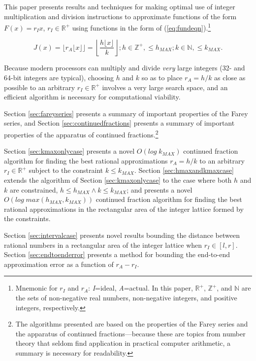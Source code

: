 \documentclass{esub2acm}
\newcommand{\realsetnonneg}{{\mathbb{R}^+}}
\newcommand{\intsetnonneg}{{\mathbb{Z}^+}}
\newcommand{\intsetpos}{{\mathbb{N}}}
\begin{document}
This paper presents results and techniques
for making optimal use of integer multiplication and division
instructions to approximate functions of the form $F(x) = r_I x$,
$r_I \in \realsetnonneg$ using
functions in the form of (\ref{eq:fundeqn}).\footnote{Mnemonic for $r_I$ and $r_A$:
\emph{I}=ideal, \emph{A}=actual.  In this paper,
$\realsetnonneg$,
$\intsetnonneg{}$, and
$\intsetpos{}$
are the sets of non-negative real numbers,
non-negative integers, and
positive integers, respectively.}

\begin{equation}
\label{eq:fundeqn}
J(x)
=
\lfloor r_A \lfloor x \rfloor \rfloor
=
\left\lfloor\frac{h \lfloor x \rfloor}{k}\right\rfloor{};
h \in \intsetnonneg{}, \leq h_{MAX} ; k \in \intsetpos{}, \leq k_{MAX}.
\end{equation}

Because modern processors can multiply and divide
\emph{very}
large integers (32- and 64-bit integers are
typical), choosing $h$ and $k$ so as to place
$r_A = h/k$ as close as possible to an arbitrary
$r_I \in \realsetnonneg$ involves a
very large search space, and an efficient algorithm
is necessary for computational viability.

Section \ref{sec:fareyseries} presents a
summary of important properties of the Farey series, and
Section \ref{sec:continuedfractions} presents a
summary of important properties of the apparatus
of continued fractions.\footnote{The algorithms presented
are based on the properties of the Farey series and
the apparatus of continued fractions---because
these are topics from number theory that seldom
find application in practical computer arithmetic, a summary
is necessary for readability.}

Section
\ref{sec:kmaxonlycase} presents a novel
$O(log \; k_{MAX})$ continued fraction algorithm
for finding the best rational approximations $r_A = h/k$
to an arbitrary $r_I \in \realsetnonneg$ subject to the constraint
$k \leq k_{MAX}$.  Section \ref{sec:hmaxandkmaxcase} extends the
algorithm of Section \ref{sec:kmaxonlycase}
to the case where both $h$ and $k$
are constrained, $h \leq h_{MAX} \wedge k \leq k_{MAX}$; and presents
a novel $O(log \; max(h_{MAX}, k_{MAX}))$ continued fraction
algorithm for finding the best rational approximations in the
rectangular area of the integer lattice formed by the constraints.

Section \ref{sec:intervalcase} presents novel results
bounding the distance between rational numbers in a rectangular area of the
integer lattice when $r_I \in [l,r]$.
Section \ref{sec:endtoenderror} presents a method for bounding
the end-to-end approximation error as a function of $r_A-r_I$.
\end{document}
